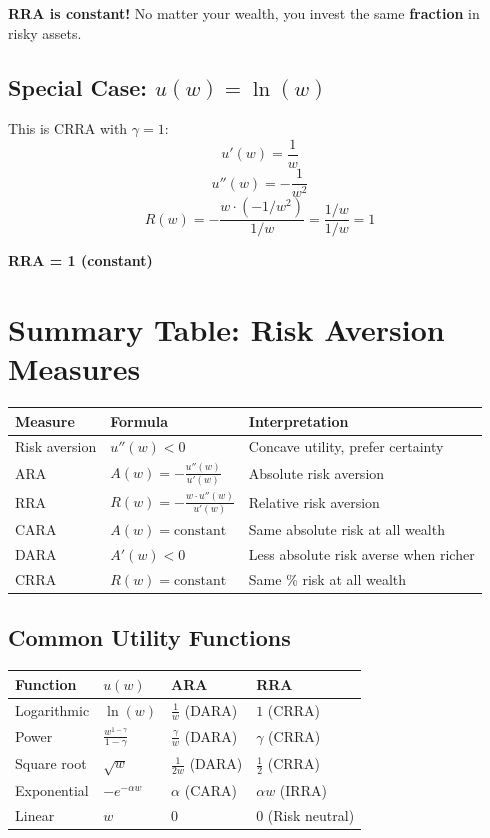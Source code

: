 \documentclass[12pt]{article}
\begin{document}
\textbf{RRA is constant!} No matter your wealth, you invest the same \textbf{fraction} in risky assets.

\subsection*{Special Case: $u(w) = \ln(w)$}

This is CRRA with $\gamma = 1$:
$$u'(w) = \frac{1}{w}$$
$$u''(w) = -\frac{1}{w^2}$$
$$R(w) = -\frac{w \cdot (-1/w^2)}{1/w} = \frac{1/w}{1/w} = 1$$

\textbf{RRA = 1 (constant)}

\newpage

\section*{Summary Table: Risk Aversion Measures}

\begin{center}
\begin{tabular}{|l|l|l|}
\hline
\textbf{Measure} & \textbf{Formula} & \textbf{Interpretation} \\
\hline
Risk aversion & $u''(w) < 0$ & Concave utility, prefer certainty \\
\hline
ARA & $A(w) = -\frac{u''(w)}{u'(w)}$ & Absolute risk aversion \\
\hline
RRA & $R(w) = -\frac{w \cdot u''(w)}{u'(w)}$ & Relative risk aversion \\
\hline
CARA & $A(w) = \text{constant}$ & Same absolute risk at all wealth \\
\hline
DARA & $A'(w) < 0$ & Less absolute risk averse when richer \\
\hline
CRRA & $R(w) = \text{constant}$ & Same \% risk at all wealth \\
\hline
\end{tabular}
\end{center}

\subsection*{Common Utility Functions}

\begin{center}
\begin{tabular}{|l|l|l|l|}
\hline
\textbf{Function} & \textbf{$u(w)$} & \textbf{ARA} & \textbf{RRA} \\
\hline
Logarithmic & $\ln(w)$ & $\frac{1}{w}$ (DARA) & $1$ (CRRA) \\
\hline
Power & $\frac{w^{1-\gamma}}{1-\gamma}$ & $\frac{\gamma}{w}$ (DARA) & $\gamma$ (CRRA) \\
\hline
Square root & $\sqrt{w}$ & $\frac{1}{2w}$ (DARA) & $\frac{1}{2}$ (CRRA) \\
\hline
Exponential & $-e^{-\alpha w}$ & $\alpha$ (CARA) & $\alpha w$ (IRRA) \\
\hline
Linear & $w$ & $0$ & $0$ (Risk neutral) \\
\hline
\end{tabular}
\end{center}
\end{document}
